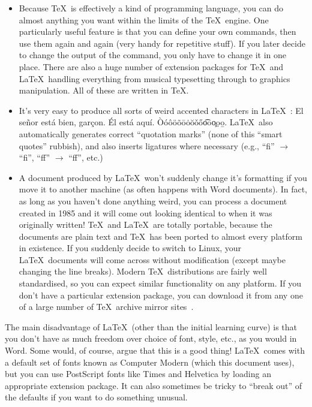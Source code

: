 \documentclass[11pt,a4paper]{article}
\begin{document}
\begin{itemize}
	\item Because \TeX\ is effectively a kind of programming language,
	you can do almost anything you want within the limits of the \TeX\
	engine. One particularly useful feature is that you can define your
	own commands, then use them again and again (very handy for
	repetitive stuff). If you later decide to change the output of the
	command, you only have to change it in one place. There are also a
	huge number of extension packages for \TeX\ and \LaTeX\, handling
	everything from musical typesetting through to graphics
	manipulation. All of these are written in \TeX.
	
	\item It's very easy to produce all sorts of weird accented
	characters in \LaTeX~\cite{UsersGuide}: El se\~{n}or est\'{a} bien,
	gar\c{c}on. \'{E}l est\'{a} aqu\'{i}.
	\`{O}\'{o}\^{o}\"{o}\~{o}\={o}\.{o}\u{o}\v{o}\H{o}\t{oo}\c{o}\d{o}\b{o}.
	\LaTeX\ also automatically generates correct ``quotation marks''
	(none of this ``smart quotes'' rubbish), and also inserts ligatures
	where necessary (e.g., ``f{}i'' $\rightarrow$ ``fi'', ``f{}f''
	$\rightarrow$ ``ff'', etc.)

	\item A document produced by \LaTeX\ won't suddenly change it's
	formatting if you move it to another machine (as often happens with
	Word documents). In fact, as long as you haven't done anything
	weird, you can process a document created in 1985 and it will come
	out looking identical to when it was originally written! \TeX\ and
	\LaTeX\ are totally portable, because the documents are plain text
	and \TeX\ has been ported to almost every platform in existence. If
	you suddenly decide to switch to Linux, your \LaTeX\ documents will
	come across without modification (except maybe changing the line
	breaks). Modern \TeX\ distributions are fairly well standardised, so
	you can expect similar functionality on any platform. If you don't
	have a particular extension package, you can download it from any
	one of a large number of \TeX\ archive mirror
	sites~\cite{CTAN}.

\end{itemize}

The main disadvantage of \LaTeX\ (other than the initial learning curve)
is that you don't have as much freedom over choice of font, style, etc.,
as you would in Word. Some would, of course, argue that this is a good
thing! \LaTeX\ comes with a default set of fonts known as Computer
Modern (which this document uses), but you can use PostScript fonts like
{\fontfamily{ptm}\selectfont Times} and {\fontfamily{phv}\selectfont
Helvetica} by loading an appropriate extension package. It can also
sometimes be tricky to ``break out'' of the defaults if you want to do
something unusual.
\end{document}

